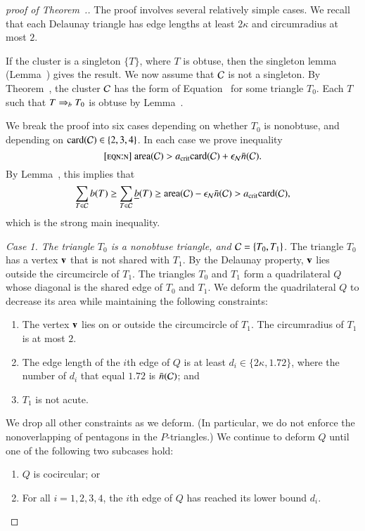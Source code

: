 \begin{proof}[proof of Theorem~.]
  The proof involves several relatively simple cases.  
  We recall that each Delaunay triangle has edge lengths at
  least $2\kappa$ and circumradius at most $2$.

  If the cluster is a singleton $\{T\}$, where $T$ is obtuse, then the
  singleton lemma (Lemma~) gives the result.  We
  now assume that $\mathcal C$ is not a singleton.  By
  Theorem~, the cluster $\mathcal C$ has the form of
  Equation~ for some triangle $T_0$.  Each $T$ such
  that $T\Rightarrow_{b} T_0$ is obtuse by Lemma~.

  We break the proof into six cases depending on whether $T_0$ is
  nonobtuse, and depending on ${\operatorname{card}}(\mathcal C)\in \{2,3,4\}$.  In each case
  we prove inequality
\begin{equation}\libel{eqn:n}
 \area(\C) > \acrit \card(\C) + \epsN \tn(\C).
\end{equation}
By Lemma~,    this implies that
\[
\sum_{T\in\mathcal C} b(T) \ge \sum_{T\in\mathcal C} \underline{b}(T) 
\ge {\operatorname{area}}(\mathcal C) -  \epsilon_{\mathcal N}\bar n(\mathcal C) 
> a_\text{crit} {\operatorname{card}}(\mathcal C),
\]
which is the strong main inequality.

{\it Case 1. The triangle $T_0$ is a nonobtuse triangle, and
  $\mathcal C=\{T_0,T_1\}$.}  The triangle $T_0$ has a vertex ${\mathbf v}$ that is
not shared with $T_1$.  By the Delaunay property, ${\mathbf v}$ lies outside
the circumcircle of $T_1$.  The triangles $T_0$ and $T_1$ form a
quadrilateral $Q$ whose diagonal is the shared edge of $T_0$ and
$T_1$.  We deform the quadrilateral $Q$ to decrease its area while
maintaining the following constraints:
\begin{enumerate}
\item The vertex ${\mathbf v}$ lies on or outside the circumcircle of
  $T_1$. The circumradius of $T_1$ is at most $2$.
\item The edge length of the $i$th edge of $Q$ is at least
  $d_i\in\{2\kappa,1.72\}$,
where  the number of $d_i$ that equal $1.72$ is $\bar n(\mathcal C)$; and
\item $T_1$ is not acute.
\end{enumerate}
We drop all other constraints as we deform. (In particular, we do not
enforce the nonoverlapping of pentagons in the $P$-triangles.)  We
continue to deform $Q$ until one of the following two subcases hold:
\begin{enumerate}
\item $Q$ is cocircular; or
\item For all $i=1,2,3,4$, the $i$th edge of $Q$ has reached its lower
  bound $d_i$.
\end{enumerate}


\end{proof}
